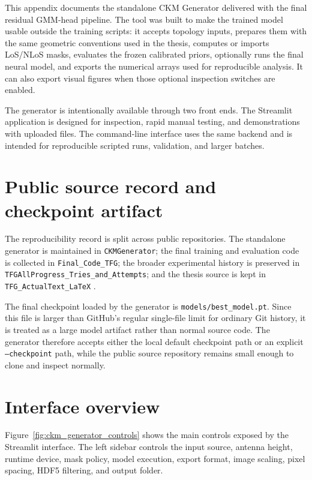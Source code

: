 This appendix documents the standalone CKM Generator delivered with the final
residual GMM-head pipeline. The tool was built to make the trained model usable outside
the training scripts: it accepts topology inputs, prepares them with the same
geometric conventions used in the thesis, computes or imports LoS/NLoS masks,
evaluates the frozen calibrated priors, optionally runs the final neural model,
and exports the numerical arrays used for reproducible analysis. It can also
export visual figures when those optional inspection switches are enabled.

The generator is intentionally available through two front ends. The Streamlit
application is designed for inspection, rapid manual testing, and demonstrations
with uploaded files. The command-line interface uses the same backend and is
intended for reproducible scripted runs, validation, and larger batches.

\section{Public source record and checkpoint artifact}

The reproducibility record is split across public repositories. The standalone
generator is maintained in \texttt{CKMGenerator}; the final training and
evaluation code is collected in \texttt{Final\_Code\_TFG}; the broader
experimental history is preserved in
\texttt{TFGAllProgress\_Tries\_and\_Attempts}; and the thesis source is kept in
\texttt{TFG\_ActualText\_LaTeX}
\cite{moreno2026ckmgenerator,moreno2026finalcode,moreno2026tfgprogress,moreno2026tfgtext}.

The final checkpoint loaded by the generator is
\texttt{models/best\_model.pt}. Since this file is larger than GitHub's regular
single-file limit for ordinary Git history, it is treated as a large model
artifact rather than normal source code. The generator therefore accepts either
the local default checkpoint path or an explicit \texttt{--checkpoint} path,
while the public source repository remains small enough to clone and inspect
normally.

\section{Interface overview}

Figure~\ref{fig:ckm_generator_controls} shows the main controls exposed by the
Streamlit interface. The left sidebar controls the input source, antenna height,
runtime device, mask policy, model execution, export format, image scaling,
pixel spacing, HDF5 filtering, and output folder.

